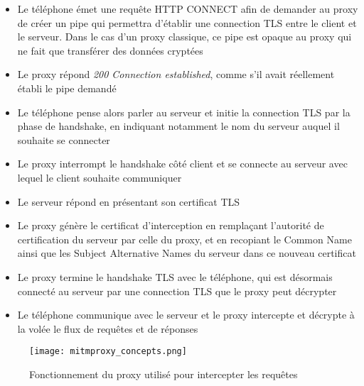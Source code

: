 \documentclass[runningheads]{llncs}
\begin{document}
\begin{itemize}
    \item Le téléphone émet une requête HTTP CONNECT afin de demander au proxy de créer un pipe qui permettra d'établir une connection TLS entre le client et le serveur. Dans le cas d'un proxy classique, ce pipe est opaque au proxy qui ne fait que transférer des données cryptées
    \item Le proxy répond \textit{200 Connection established}, comme s'il avait réellement établi le pipe demandé
    \item Le téléphone pense alors parler au serveur et initie la connection TLS par la phase de handshake, en indiquant notamment le nom du serveur auquel il souhaite se connecter
    \item Le proxy interrompt le handshake côté client et se connecte au serveur avec lequel le client souhaite communiquer
    \item Le serveur répond en présentant son certificat TLS
    \item Le proxy génère le certificat d'interception en remplaçant l'autorité de certification du serveur par celle du proxy, et en recopiant le Common Name ainsi que les Subject Alternative Names du serveur dans ce nouveau certificat
    \item Le proxy termine le handshake TLS avec le téléphone, qui est désormais connecté au serveur par une connection TLS que le proxy peut décrypter
    \item Le téléphone communique avec le serveur et le proxy intercepte et décrypte à la volée le flux de requêtes et de réponses
\end{itemize}

\begin{figure}
    \centering
    \texttt{[image: mitmproxy\_concepts.png]}
    \caption{Fonctionnement du proxy utilisé pour intercepter les requêtes}
    \label{fig:mitmproxy/concepts}
\end{figure}
\end{document}
